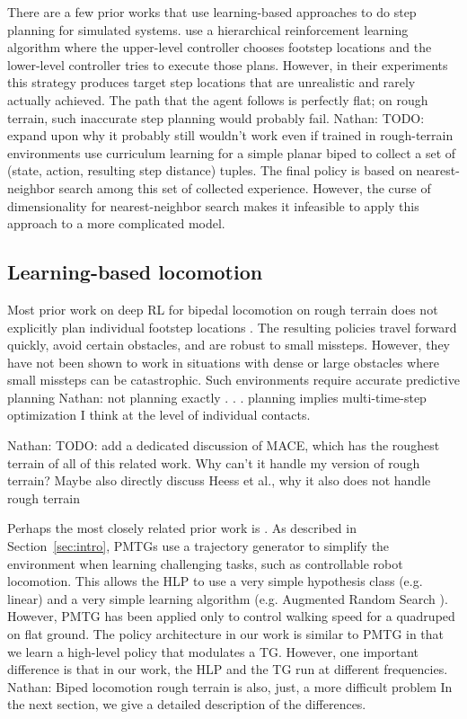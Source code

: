 \documentclass[conference]{IEEEtran}
\newcommand{\nhatch}[1]{{\leavevmode\color{magenta} Nathan: #1}}
\begin{document}
There are a few prior works that use learning-based approaches to do step planning for simulated systems.
\citet{peng2017deeploco} use a hierarchical reinforcement learning algorithm where the upper-level controller chooses footstep locations and the lower-level controller tries to execute those plans.
However, in their experiments this strategy produces target step locations that are unrealistic and rarely actually achieved.
The path that the agent follows is perfectly flat; on rough terrain, such inaccurate step planning would probably fail.
\nhatch{TODO: expand upon why it probably still wouldn't work even if trained in rough-terrain environments}
\citet{karpathy2012curriculum} use curriculum learning for a simple planar biped to collect a set of (state, action, resulting step distance) tuples.
The final policy is based on nearest-neighbor search among this set of collected experience.
However, the curse of dimensionality for nearest-neighbor search
makes it infeasible to apply this approach to a more complicated model.

\subsection{Learning-based locomotion}

Most prior work on deep RL for bipedal locomotion on rough terrain does not explicitly plan individual footstep locations \citep{peng2018deepmimic, heess2017emergence, peng2016terrain}.
The resulting policies travel forward quickly, avoid certain obstacles, and are robust to small missteps.
However, they have not been shown to work in situations with dense or large obstacles where small missteps can be catastrophic.
Such environments require accurate predictive planning \nhatch{not planning exactly . . . planning implies multi-time-step optimization I think} at the level of individual contacts.

\nhatch{TODO: add a dedicated discussion of MACE, which has the roughest terrain of all of this related work. Why can't it handle my version of rough terrain? Maybe also directly discuss Heess et al., why it also does not handle rough terrain}

Perhaps the most closely related prior work is \citet{iscen2018pmtg}.
As described in Section~\ref{sec:intro}, PMTGs use a trajectory generator to simplify the environment when learning challenging tasks, such as controllable robot locomotion.
This allows the HLP to use a very simple hypothesis class (e.g. linear) and a very simple learning algorithm (e.g. Augmented Random Search \citep{mania2018simple}).
However, PMTG has been applied only to control walking speed for a quadruped on flat ground.
The policy architecture in our work is similar to PMTG in that we learn a high-level policy that modulates a TG.
However, one important difference is that in our work, the HLP and the TG run at different frequencies.
\nhatch{Biped locomotion rough terrain is also, just, a more difficult problem}
In the next section, we give a detailed description of the differences.
\end{document}
